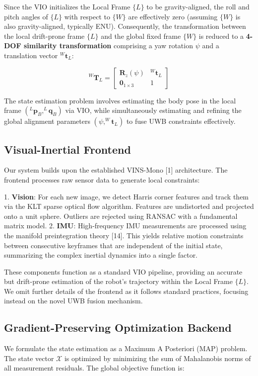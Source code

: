 \documentclass[conference]{IEEEtran}
\begin{document}
Since the VIO initializes the Local Frame $\{L\}$ to be gravity-aligned, the roll and pitch angles of $\{L\}$ with respect to $\{W\}$ are effectively zero (assuming $\{W\}$ is also gravity-aligned, typically ENU). Consequently, the transformation between the local drift-prone frame $\{L\}$ and the global fixed frame $\{W\}$ is reduced to a \textbf{4-DOF similarity transformation} comprising a yaw rotation $\psi$ and a translation vector $^W\mathbf{t}_L$:

\begin{equation}
^W\mathbf{T}_L = \begin{bmatrix} \mathbf{R}_z(\psi) & ^W\mathbf{t}_L \\ \mathbf{0}_{1\times3} & 1 \end{bmatrix}
\end{equation}

The state estimation problem involves estimating the body pose in the local frame $(^L\mathbf{p}_B, ^L\mathbf{q}_B)$ via VIO, while simultaneously estimating and refining the global alignment parameters $(\psi, ^W\mathbf{t}_L)$ to fuse UWB constraints effectively.

\subsection{Visual-Inertial Frontend}
Our system builds upon the established VINS-Mono [1] architecture. The frontend processes raw sensor data to generate local constraints:

1.  \textbf{Vision}: For each new image, we detect Harris corner features and track them via the KLT sparse optical flow algorithm. Features are undistorted and projected onto a unit sphere. Outliers are rejected using RANSAC with a fundamental matrix model.
2.  \textbf{IMU}: High-frequency IMU measurements are processed using the manifold preintegration theory [14]. This yields relative motion constraints between consecutive keyframes that are independent of the initial state, summarizing the complex inertial dynamics into a single factor.

These components function as a standard VIO pipeline, providing an accurate but drift-prone estimation of the robot's trajectory within the Local Frame $\{L\}$. We omit further details of the frontend as it follows standard practices, focusing instead on the novel UWB fusion mechanism.

\subsection{Gradient-Preserving Optimization Backend}
We formulate the state estimation as a Maximum A Posteriori (MAP) problem. The state vector $\mathcal{X}$ is optimized by minimizing the sum of Mahalanobis norms of all measurement residuals. The global objective function is:
\end{document}
